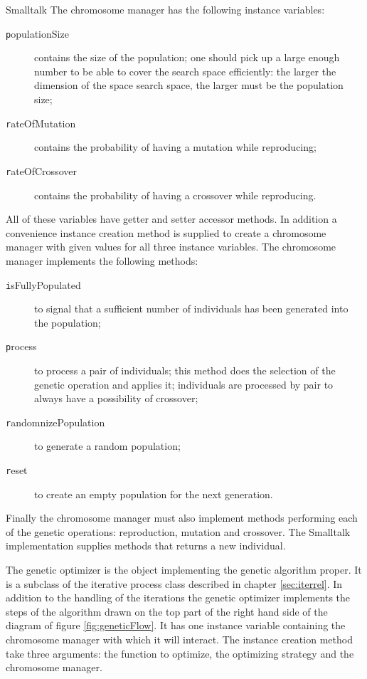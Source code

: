\begin{displaycode}{Smalltalk}
\noindent The chromosome manager has the following instance
variables:
\begin{description}
  \item[\texttt populationSize] contains the size of the population;
  one should pick up a large enough number to be able to cover the
  search space efficiently: the larger the dimension of the space
  search space, the larger must be the population size;
  \item[\texttt rateOfMutation] contains the probability of having a
  mutation while reproducing;
  \item[\texttt rateOfCrossover] contains the probability of having a
  crossover while reproducing.
\end{description}
All of these variables have getter and setter accessor methods. In
addition a convenience instance creation method is supplied to
create a chromosome manager with given values for all three
instance variables. The chromosome manager implements the
following methods:
\begin{description}
  \item[\texttt isFullyPopulated] to signal that a sufficient number of individuals
  has been generated into the population;
  \item[\texttt process] to process a pair of individuals; this method
  does the selection of the genetic operation and applies it;
  individuals are processed by pair to always have a possibility
  of crossover;
  \item[\texttt randomnizePopulation] to generate a random population;
  \item[\texttt reset] to create an empty population for the next
  generation.
\end{description}
Finally the chromosome manager must also implement methods
performing each of the genetic operations: reproduction, mutation
and crossover. The Smalltalk implementation supplies methods that
returns a new individual.

The genetic optimizer is the object implementing the genetic
algorithm proper. It is a subclass of the iterative process class
described in chapter \ref{sec:iterrel}. In addition to the
handling of the iterations the genetic optimizer implements the
steps of the algorithm drawn on the top part of the right hand
side of the diagram of figure \ref{fig:geneticFlow}. It has one
instance variable containing the chromosome manager with which it
will interact. The instance creation method take three arguments:
the function to optimize, the optimizing strategy and the
chromosome manager.


\end{displaycode}
